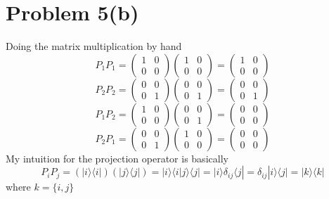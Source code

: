 \documentclass[letter]{article}
\begin{document}
\section*{Problem 5(b)}
Doing the matrix multiplication by hand
\[
P_1 P_1 = 
\begin{pmatrix} 1 & 0 \\ 0 & 0 \end{pmatrix} 
\begin{pmatrix} 1 & 0 \\ 0 & 0 \end{pmatrix}  = 
\begin{pmatrix} 1 & 0 \\ 0 & 0 \end{pmatrix} 
\] 
\[
P_2 P_2 = 
\begin{pmatrix} 0 & 0 \\ 0 & 1 \end{pmatrix} 
\begin{pmatrix} 0 & 0 \\ 0 & 1 \end{pmatrix}  = 
\begin{pmatrix} 0 & 0 \\ 0 & 1 \end{pmatrix} 
\]
\[
P_1 P_2 = 
\begin{pmatrix} 1 & 0 \\ 0 & 0 \end{pmatrix} 
\begin{pmatrix} 0 & 0 \\ 0 & 1 \end{pmatrix}  = 
\begin{pmatrix} 0 & 0 \\ 0 & 0 \end{pmatrix} 
\] 
\[
P_2 P_1 = 
\begin{pmatrix} 0 & 0 \\ 0 & 1 \end{pmatrix}  
\begin{pmatrix} 1 & 0 \\ 0 & 0 \end{pmatrix} = 
\begin{pmatrix} 0 & 0 \\ 0 & 0 \end{pmatrix} 
\] 
My intuition for the projection operator is basically 
\[
P_i P_j = (| i \rangle \langle i | ) (| j \rangle \langle j |)  = 
| i \rangle \langle i   | j \rangle \langle j |  = 
| i \rangle \delta_{ij} \langle j | = \delta_{ij} |i \rangle \langle j | = |k \rangle \langle k |  
\] where $k = \{i,j\} $ 
\end{document}
